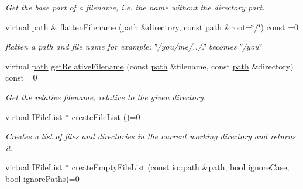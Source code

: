\begin{DoxyCompactItemize}
\begin{DoxyCompactList}\small\item\em Get the base part of a filename, i.\+e. the name without the directory part. \end{DoxyCompactList}\item 
\mbox{\label{classirr_1_1io_1_1IFileSystem_aa76bbc9cc5ec7a8dbe96713f1ba20de6}} 
virtual \hyperlink{namespaceirr_1_1io_a6468281622ce3a1c46b72e19f32dded5}{path} \& \hyperlink{classirr_1_1io_1_1IFileSystem_aa76bbc9cc5ec7a8dbe96713f1ba20de6}{flatten\+Filename} (\hyperlink{namespaceirr_1_1io_a6468281622ce3a1c46b72e19f32dded5}{path} \&directory, const \hyperlink{namespaceirr_1_1io_a6468281622ce3a1c46b72e19f32dded5}{path} \&root=\char`\"{}/\char`\"{}) const =0
\begin{DoxyCompactList}\small\item\em flatten a path and file name for example\+: \char`\"{}/you/me/../.\char`\"{} becomes \char`\"{}/you\char`\"{} \end{DoxyCompactList}\item 
\mbox{\label{classirr_1_1io_1_1IFileSystem_a9cb85c468a6cda253ff99c88010028c7}} 
virtual \hyperlink{namespaceirr_1_1io_a6468281622ce3a1c46b72e19f32dded5}{path} \hyperlink{classirr_1_1io_1_1IFileSystem_a9cb85c468a6cda253ff99c88010028c7}{get\+Relative\+Filename} (const \hyperlink{namespaceirr_1_1io_a6468281622ce3a1c46b72e19f32dded5}{path} \&filename, const \hyperlink{namespaceirr_1_1io_a6468281622ce3a1c46b72e19f32dded5}{path} \&directory) const =0
\begin{DoxyCompactList}\small\item\em Get the relative filename, relative to the given directory. \end{DoxyCompactList}\item 
virtual \hyperlink{classirr_1_1io_1_1IFileList}{I\+File\+List} $\ast$ \hyperlink{classirr_1_1io_1_1IFileSystem_ad5820e7664377c12015ea7a6c801f7f8}{create\+File\+List} ()=0
\begin{DoxyCompactList}\small\item\em Creates a list of files and directories in the current working directory and returns it. \end{DoxyCompactList}\item 
virtual \hyperlink{classirr_1_1io_1_1IFileList}{I\+File\+List} $\ast$ \hyperlink{classirr_1_1io_1_1IFileSystem_a4f8a69f557f2b7022f6cd7346c3e85d2}{create\+Empty\+File\+List} (const \hyperlink{namespaceirr_1_1io_a6468281622ce3a1c46b72e19f32dded5}{io\+::path} \&\hyperlink{namespaceirr_1_1io_a6468281622ce3a1c46b72e19f32dded5}{path}, bool ignore\+Case, bool ignore\+Paths)=0

\end{DoxyCompactItemize}
